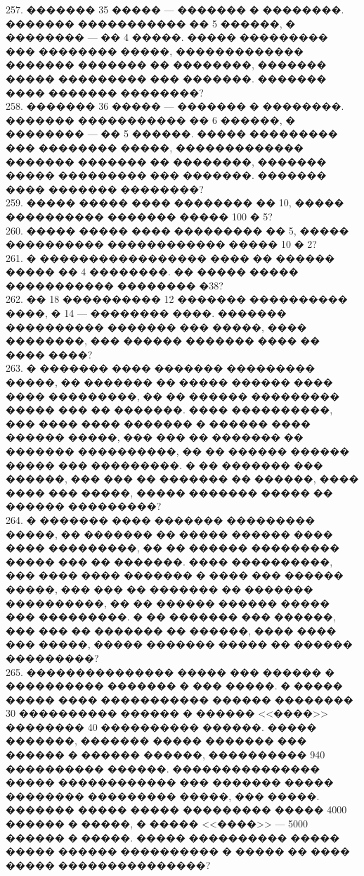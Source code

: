 \documentclass[12pt]{article}
\begin{document}
257. ������� 35 ����� --- ������� � ��������. ������� ����������� �� 5 ������, � �������� --- �� 4 �����. ����� ��������� ��� �������� �����, ������������� ������� ������� �� ��������, ������� ����� ��������� ��� �������. ������� ���� ������� ��������?\\
258. ������� 36 ����� --- ������� � ��������. ������� ����������� �� 6 ������, � �������� --- �� 5 ������. ����� ��������� ��� �������� �����, ������������� ������� ������� �� ��������, ������� ����� ��������� ��� �������. ������� ���� ������� ��������?\\
259. ����� ����� ���� �������� �� 10, ����� ���������� ������� ����� 100 � 5?\\
260. ����� ����� ���� ��������� �� 5, ����� ���������� ������������ ����� 10 � 2?\\
261. � ����������������� ���� �� ������ ����� �� 4 ��������. �� ����� ����� ����������� �������� �38?\\
262. �� 18 ���������� 12 ������� ���������� ����, � 14 --- �������� ����. ������� ���������� ������� ��� �����, ���� ��������, ��� ������ ������� ���� �� ���� ����?\\
263. � ������� ���� ������� ��������� �����, �� ������� �� ����� ������ ���� ���� ���������, �� �� ������ ��������� ����� ��� �� �������. ���� ����������, ��� ���� ���� ������� � ������ ���� ������ �����, ��� ��� �� ������� �� ������� ����������, �� �� ������ ������ ����� ��� ���������. � �� ������� ��� ������, ��� ��� �� ������� �� ������, ���� ���� ��� �����, ����� ������� ����� �� ������ ���������?\\
264. � ������� ���� ������� ��������� �����, �� ������� �� ����� ������ ���� ���� ���������, �� �� ������ ��������� ����� ��� �� �������. ���� ����������, ��� ���� ���� ������� � ���� ��� ������ �����, ��� ��� �� ������� �� ������� ����������, �� �� ������ ������ ����� ��� ���������. � �� ������� ��� ������, ��� ��� �� ������� �� ������, ���� ���� ��� �����, ����� ������� ����� �� ������ ���������?\\
265. ��������������� ����� ��� ������ � ���������� ������� � ��� �����. � ����� ����� ���� ����������� ������ �������� 30 ���������� ������ � ������ <<����>> �������� 40 ���������� ������. ����� �������, ������� ����� ������� ��� ������ � ������ ������, ���������� 940 ���������� ������. ��������������� ����� ������������ ��� ������� ����� �������� ��������� �����, ��� �����. ������� ����� ����� ��������� ����� 4000 ������ � �����, � ����� <<����>> --- 5000 ������ � �����. ����� ���������� ����� ����� ������ ���������� � ����� �� ���� ����� ���������������?\\
\end{document}

